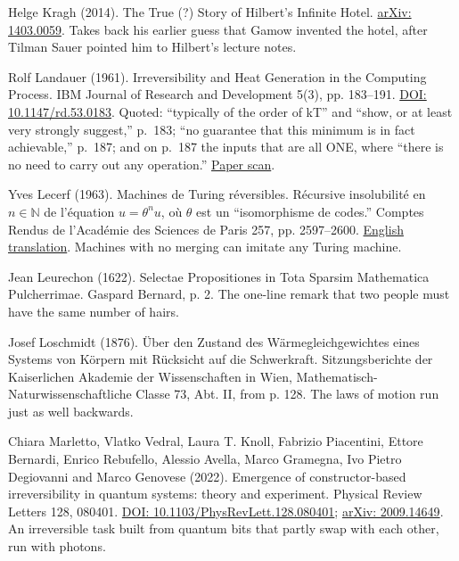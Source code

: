 \documentclass[11pt,twoside]{article}
\theoremstyle{thielethm}
\theoremstyle{thieledef}
\theoremstyle{thieledef}
\theoremstyle{thieledef}
\theoremstyle{thielethm}
\theoremstyle{thieleobs}
\theoremstyle{thielethm}
\begin{document}
\noindent Helge Kragh (2014). The True (?) Story of Hilbert's Infinite Hotel. \href{https://arxiv.org/abs/1403.0059}{arXiv: 1403.0059}. Takes back his earlier guess that Gamow invented the hotel, after Tilman Sauer pointed him to Hilbert's lecture notes.
\par\medskip

\noindent Rolf Landauer (1961). Irreversibility and Heat Generation in the Computing Process. IBM Journal of Research and Development 5(3), pp. 183--191. \href{https://doi.org/10.1147/rd.53.0183}{DOI: 10.1147/rd.53.0183}. Quoted: ``typically of the order of kT'' and ``show, or at least very strongly suggest,'' p.~183; ``no guarantee that this minimum is in fact achievable,'' p.~187; and on p.~187 the inputs that are all ONE, where ``there is no need to carry out any operation.'' \href{https://fab.cba.mit.edu/classes/862.22/notes/computation/Landauer-1961.pdf}{Paper scan}.
\par\medskip

\noindent Yves Lecerf (1963). Machines de Turing r\'eversibles. R\'ecursive insolubilit\'e en $n \in \mathbb{N}$ de l'\'equation $u = \theta^n u$, o\`u $\theta$ est un ``isomorphisme de codes.'' Comptes Rendus de l'Acad\'emie des Sciences de Paris 257, pp. 2597--2600. \href{https://revcomp.info/legacy/mpf/rc/Lecerf/english/english.html}{English translation}. Machines with no merging can imitate any Turing machine.
\par\medskip

\noindent Jean Leurechon (1622). Selectae Propositiones in Tota Sparsim Mathematica Pulcherrimae. Gaspard Bernard, p. 2. The one-line remark that two people must have the same number of hairs.
\par\medskip

\noindent Josef Loschmidt (1876). \"Uber den Zustand des W\"armegleichgewichtes eines Systems von K\"orpern mit R\"ucksicht auf die Schwerkraft. Sitzungsberichte der Kaiserlichen Akademie der Wissenschaften in Wien, Mathematisch-Naturwissenschaftliche Classe 73, Abt. II, from p. 128. The laws of motion run just as well backwards.
\par\medskip

\noindent Chiara Marletto, Vlatko Vedral, Laura T. Knoll, Fabrizio Piacentini, Ettore Bernardi, Enrico Rebufello, Alessio Avella, Marco Gramegna, Ivo Pietro Degiovanni and Marco Genovese (2022). Emergence of constructor-based irreversibility in quantum systems: theory and experiment. Physical Review Letters 128, 080401. \href{https://doi.org/10.1103/PhysRevLett.128.080401}{DOI: 10.1103/PhysRevLett.128.080401}; \href{https://arxiv.org/abs/2009.14649}{arXiv: 2009.14649}. An irreversible task built from quantum bits that partly swap with each other, run with photons.
\par\medskip
\end{document}
